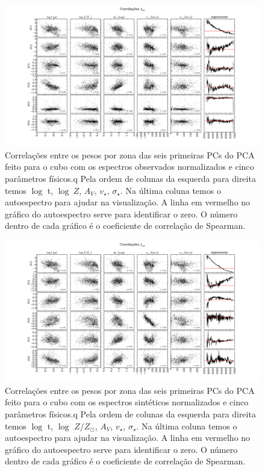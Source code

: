 \begin{figure}
    \includegraphics[width=1.3\textwidth, angle=-90]{figuras/K0008-correl-f_obs_norm-PCvsPhys.pdf}
	\caption[Correlações PCs vs. par\^ametros f\'isicos - $f_{obs}$ - NGC 0001]
    {Correlações entre os pesos por zona das seis primeiras PCs do PCA feito para o cubo com os espectros observados
    normalizados e cinco parâmetros físicos.q Pela ordem de colunas da esquerda para direita temos $\log$ t, $\log\ Z$,
    $A_V$, $v_{\star}$, $\sigma_{\star}$. Na última coluna temos o autoespectro para ajudar na visualização. A linha em
    vermelho no gráfico do autoespectro serve para identificar o zero. O número dentro de cada gráfico é o coeficiente
    de correlação de Spearman.}
    \label{fig:K0008correfobsnorm}
\end{figure}

\begin{figure}
    \includegraphics[width=1.3\textwidth, angle=-90]{figuras/K0008-correl-f_syn_norm-PCvsPhys.pdf}
	\caption[Correlações PCs vs. par\^ametros f\'isicos - $f_{syn}$ - NGC 0001]
    {Correlações entre os pesos por zona das seis primeiras PCs do PCA feito para o cubo com os espectros sintéticos
    normalizados e cinco parâmetros físicos.q Pela ordem de colunas da esquerda para direita temos $\log$ t, $\log$ $Z /
    Z_{\odot}$, $A_V$, $v_{\star}$, $\sigma_{\star}$. Na última coluna temos o autoespectro para ajudar na visualização.
    A linha em vermelho no gráfico do autoespectro serve para identificar o zero. O número dentro de cada gráfico é o
    coeficiente de correlação de Spearman.}
    \label{fig:K0008correfsynnorm}
\end{figure}

